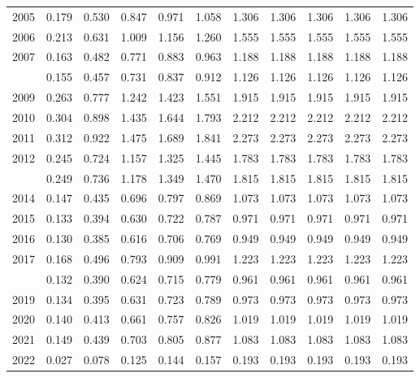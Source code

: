 \documentclass[
]{article}
\begin{document}
\begin{longtable}[t]{lrrrrrrrrrr}
2005 & 0.179 & 0.530 & 0.847 & 0.971 & 1.058 & 1.306 & 1.306 & 1.306 & 1.306 & 1.306\\
2006 & 0.213 & 0.631 & 1.009 & 1.156 & 1.260 & 1.555 & 1.555 & 1.555 & 1.555 & 1.555\\
2007 & 0.163 & 0.482 & 0.771 & 0.883 & 0.963 & 1.188 & 1.188 & 1.188 & 1.188 & 1.188\\
\addlinespace
2008 & 0.155 & 0.457 & 0.731 & 0.837 & 0.912 & 1.126 & 1.126 & 1.126 & 1.126 & 1.126\\
2009 & 0.263 & 0.777 & 1.242 & 1.423 & 1.551 & 1.915 & 1.915 & 1.915 & 1.915 & 1.915\\
2010 & 0.304 & 0.898 & 1.435 & 1.644 & 1.793 & 2.212 & 2.212 & 2.212 & 2.212 & 2.212\\
2011 & 0.312 & 0.922 & 1.475 & 1.689 & 1.841 & 2.273 & 2.273 & 2.273 & 2.273 & 2.273\\
2012 & 0.245 & 0.724 & 1.157 & 1.325 & 1.445 & 1.783 & 1.783 & 1.783 & 1.783 & 1.783\\
\addlinespace
2013 & 0.249 & 0.736 & 1.178 & 1.349 & 1.470 & 1.815 & 1.815 & 1.815 & 1.815 & 1.815\\
2014 & 0.147 & 0.435 & 0.696 & 0.797 & 0.869 & 1.073 & 1.073 & 1.073 & 1.073 & 1.073\\
2015 & 0.133 & 0.394 & 0.630 & 0.722 & 0.787 & 0.971 & 0.971 & 0.971 & 0.971 & 0.971\\
2016 & 0.130 & 0.385 & 0.616 & 0.706 & 0.769 & 0.949 & 0.949 & 0.949 & 0.949 & 0.949\\
2017 & 0.168 & 0.496 & 0.793 & 0.909 & 0.991 & 1.223 & 1.223 & 1.223 & 1.223 & 1.223\\
\addlinespace
2018 & 0.132 & 0.390 & 0.624 & 0.715 & 0.779 & 0.961 & 0.961 & 0.961 & 0.961 & 0.961\\
2019 & 0.134 & 0.395 & 0.631 & 0.723 & 0.789 & 0.973 & 0.973 & 0.973 & 0.973 & 0.973\\
2020 & 0.140 & 0.413 & 0.661 & 0.757 & 0.826 & 1.019 & 1.019 & 1.019 & 1.019 & 1.019\\
2021 & 0.149 & 0.439 & 0.703 & 0.805 & 0.877 & 1.083 & 1.083 & 1.083 & 1.083 & 1.083\\
2022 & 0.027 & 0.078 & 0.125 & 0.144 & 0.157 & 0.193 & 0.193 & 0.193 & 0.193 & 0.193\\*
\end{longtable}
\end{document}
